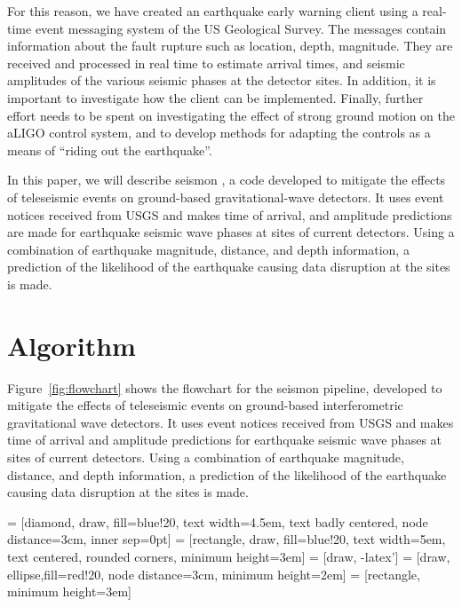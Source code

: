 \documentclass[reprint, prl, aps, showpacs]{revtex4-1}
\newcommand{\seismon}{\textnormal{seismon }}
\begin{document}
For this reason, we have created an earthquake early warning client using a real-time event messaging system of the US Geological Survey. The messages contain information about the fault rupture such as location, depth, magnitude. They are received and processed in real time to estimate arrival times, and seismic amplitudes of the various seismic phases at the detector sites. In addition, it is important to investigate how the client can be implemented. Finally, further effort needs to be spent on investigating the effect of strong ground motion on the aLIGO control system, and to develop methods for adapting the controls as a means of ``riding out the earthquake''.

In this paper, we will describe \seismon, a code developed to mitigate the effects of teleseismic events on ground-based gravitational-wave detectors. It uses event notices received from USGS and makes time of arrival, and amplitude predictions are made for earthquake seismic wave phases at sites of current detectors. Using a combination of earthquake magnitude, distance, and depth information, a prediction of the likelihood of the earthquake causing data disruption at the sites is made.

\section{Algorithm}
\label{sec:algorithm}

Figure~\ref{fig:flowchart} shows the flowchart for the \seismon pipeline, developed to mitigate the effects of teleseismic events on ground-based interferometric gravitational wave detectors. It uses event notices received from USGS and makes time of arrival and amplitude predictions for earthquake seismic wave phases at sites of current detectors. Using a combination of earthquake magnitude, distance, and depth information, a prediction of the likelihood of the earthquake causing data disruption at the sites is made.

 = [diamond, draw, fill=blue!20,
    text width=4.5em, text badly centered, node distance=3cm, inner sep=0pt]
 = [rectangle, draw, fill=blue!20,
    text width=5em, text centered, rounded corners, minimum height=3em]
 = [draw, -latex']
 = [draw, ellipse,fill=red!20, node distance=3cm,
    minimum height=2em]
 = [rectangle, minimum height=3em]
\end{document}
